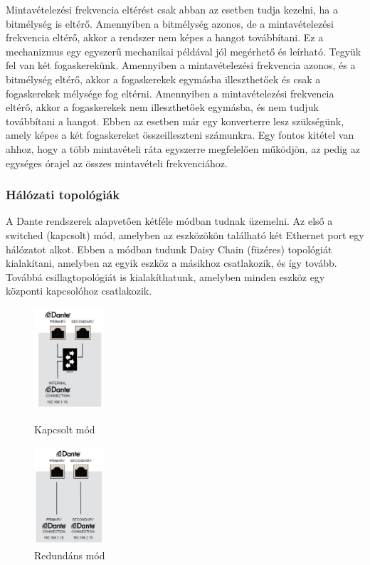 Mintavételezési frekvencia eltérést csak abban az esetben tudja kezelni, ha a
bitmélység is eltérő. Amennyiben a bitmélység azonos, de a mintavételezési
frekvencia eltérő, akkor a rendszer nem képes a hangot továbbítani.
Ez a mechanizmus egy egyszerű mechanikai példával jól megérhető és leírható.
Tegyük fel van két fogaskerekünk. Amennyiben a mintavételezési frekvencia azonos, és a 
bitmélység eltérő, akkor a fogaskerekek egymásba illeszthetőek és csak a fogaskerekek
mélysége fog eltérni. Amennyiben a mintavételezési frekvencia eltérő, akkor a fogaskerekek
nem illeszthetőek egymásba, és nem tudjuk továbbítani a hangot. Ebben az esetben már egy
konverterre lesz szükségünk, amely képes a két fogaskereket összeilleszteni számunkra.
Egy fontos kitétel van ahhoz, hogy a több mintavételi ráta egyszerre megfelelően működjön,
az pedig az egységes órajel az összes mintavételi frekvenciához.

\subsubsection{Hálózati topológiák}
A Dante rendszerek alapvetően kétféle módban tudnak üzemelni. Az első a
switched (kapcsolt) mód, amelyben az eszközökön található két Ethernet port
egy hálózatot alkot. Ebben a módban tudunk Daisy Chain (füzéres) topológiát kialakítani,
amelyben az egyik eszköz a másikhoz csatlakozik, és így tovább. Továbbá csillagtopológiát
is kialakíthatunk, amelyben minden eszköz egy központi kapcsolóhoz csatlakozik.
\begin{figure}[H]
	\begin{minipage}{0.5\textwidth}
		\centering
		\includegraphics[width=100px, keepaspectratio]{figures/dante-switched-mode.jpg}
		\caption{Kapcsolt mód}
		\label{fig:dante_switched}
	\end{minipage}%
	\begin{minipage}{0.5\textwidth}
		\centering
		\includegraphics[width=100px, keepaspectratio]{figures/dante-redundant-mode.jpg}
		\caption{Redundáns mód}
		\label{fig:dante_redundant}
	\end{minipage}
\end{figure}

